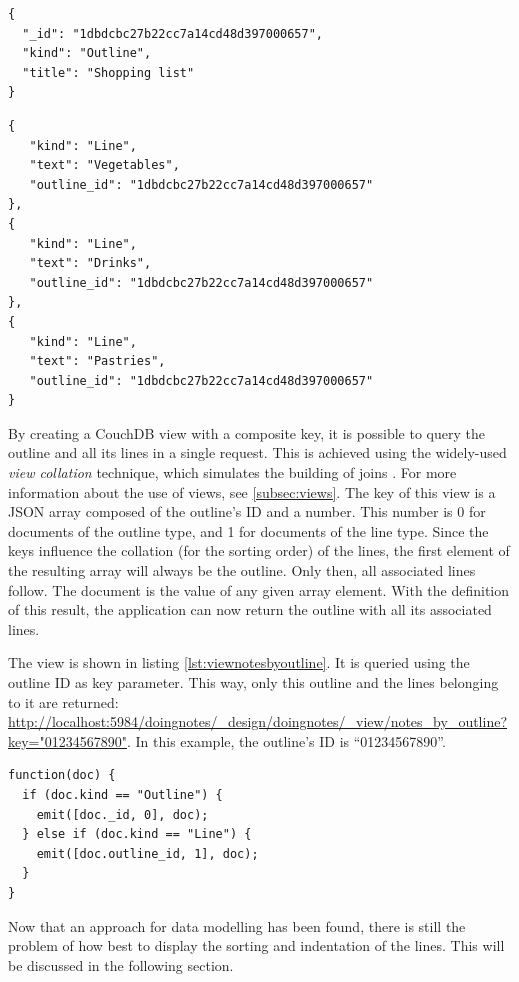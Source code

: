 \medskip
\begin{lstlisting}[caption=Outline with ID and type, label={lst:outlineforview}]
{
  "_id": "1dbdcbc27b22cc7a14cd48d397000657",
  "kind": "Outline",
  "title": "Shopping list"
}
\end{lstlisting}

\medskip
\begin{lstlisting}[caption=Three lines with ID and type, label={lst:linesforview}]
{
   "kind": "Line",
   "text": "Vegetables",
   "outline_id": "1dbdcbc27b22cc7a14cd48d397000657"
},
{
   "kind": "Line",
   "text": "Drinks",
   "outline_id": "1dbdcbc27b22cc7a14cd48d397000657"
},
{
   "kind": "Line",
   "text": "Pastries",
   "outline_id": "1dbdcbc27b22cc7a14cd48d397000657"
}
\end{lstlisting}

By creating a CouchDB view with a composite key, it is possible to query the outline and all its lines in a single request. This is achieved using the widely-used \textit{view collation} technique, which simulates the building of joins \cite{couchdb:joins}. For more information about the use of views, see \ref{subsec:views}. The key of this view is a JSON array composed of the outline's ID and a number. This number is 0 for documents of the {\selectfont outline} type, and 1 for documents of the {\selectfont line} type. Since the keys influence the collation (for the sorting order) of the lines, the first element of the resulting array will always be the outline. Only then, all associated lines follow. The document is the value of any given array element. With the definition of this result, the application can now return the outline with all its associated lines.

The view is shown in listing \ref{lst:viewnotesbyoutline}. It is queried using the outline ID as key parameter. This way, only this outline and the lines belonging to it are returned:
\url{http://localhost:5984/doingnotes/_design/doingnotes/_view/notes_by_outline?key="01234567890"}. In this example, the outline's ID is \enquote{01234567890}. 

\medskip
\begin{lstlisting}[caption=View to return all lines belonging to an outline, label={lst:viewnotesbyoutline}]
function(doc) {
  if (doc.kind == "Outline") {
    emit([doc._id, 0], doc);
  } else if (doc.kind == "Line") {
    emit([doc.outline_id, 1], doc);
  }
}
\end{lstlisting}

Now that an approach for data modelling has been found, there is still the problem of how best to display the sorting and indentation of the lines. This will be discussed in the following section.

